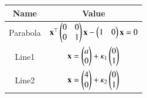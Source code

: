 \begin{tabular}{|c|c|}
\hline
\textbf{Name} & \textbf{Value} \\
\hline
Parabola & $\mathbf{x}^\top\begin{pmatrix}0&0\\0&1\end{pmatrix}\mathbf{x} - \begin{pmatrix}1 & 0\end{pmatrix}\mathbf{x} = 0$ \\
\hline
Line1 & $\mathbf{x} = \begin{pmatrix}a \\ 0\end{pmatrix} + \kappa_1\begin{pmatrix}0 \\ 1\end{pmatrix}$ \\
\hline
Line2 & $\mathbf{x} = \begin{pmatrix}4 \\ 0\end{pmatrix} + \kappa_2\begin{pmatrix}0 \\ 1\end{pmatrix}$ \\
\hline
\end{tabular}
